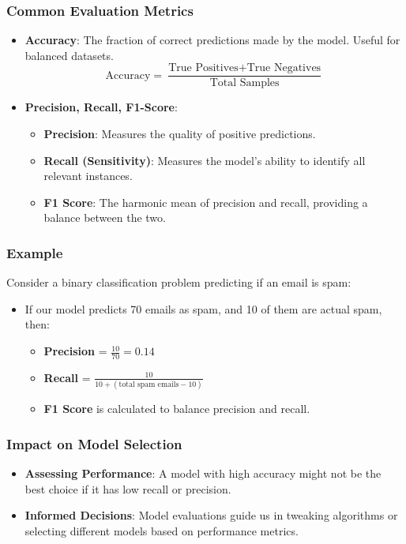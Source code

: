 \documentclass[aspectratio=169]{beamer}
\begin{document}
\begin{frame}[fragile]
    \frametitle{Common Evaluation Metrics}
    \begin{itemize}
        \item \textbf{Accuracy}: The fraction of correct predictions made by the model. Useful for balanced datasets.
        \begin{equation}
            \text{Accuracy} = \frac{\text{True Positives} + \text{True Negatives}}{\text{Total Samples}}
        \end{equation}
        
        \item \textbf{Precision, Recall, F1-Score}:
        \begin{itemize}
            \item \textbf{Precision}: Measures the quality of positive predictions.
            \item \textbf{Recall (Sensitivity)}: Measures the model's ability to identify all relevant instances.
            \item \textbf{F1 Score}: The harmonic mean of precision and recall, providing a balance between the two.
        \end{itemize}
    \end{itemize}
\end{frame}

\begin{frame}[fragile]
    \frametitle{Example}
    Consider a binary classification problem predicting if an email is spam:
    \begin{itemize}
        \item If our model predicts 70 emails as spam, and 10 of them are actual spam, then:
        \begin{itemize}
            \item \textbf{Precision} = \( \frac{10}{70} = 0.14 \)
            \item \textbf{Recall} = \( \frac{10}{10 + (\text{total spam emails} - 10)} \)
            \item \textbf{F1 Score} is calculated to balance precision and recall.
        \end{itemize}
    \end{itemize}
\end{frame}

\begin{frame}[fragile]
    \frametitle{Impact on Model Selection}
    \begin{itemize}
        \item \textbf{Assessing Performance}: A model with high accuracy might not be the best choice if it has low recall or precision.
        \item \textbf{Informed Decisions}: Model evaluations guide us in tweaking algorithms or selecting different models based on performance metrics.
    \end{itemize}
\end{frame}
\end{document}
